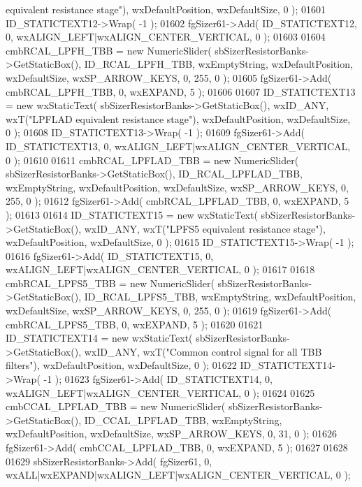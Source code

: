 \begin{DoxyCode}
{       equivalent resistance stage"}), wxDefaultPosition, wxDefaultSize, 0 );
01601     ID_STATICTEXT12->Wrap( -1 );
01602     fgSizer61->Add( ID_STATICTEXT12, 0, wxALIGN\_LEFT|wxALIGN\_CENTER\_VERTICAL, 0 );
01603     
01604     cmbRCAL_LPFH_TBB = \textcolor{keyword}{new} NumericSlider( sbSizerResistorBanks->GetStaticBox(), 
      ID_RCAL_LPFH_TBB, wxEmptyString, wxDefaultPosition, wxDefaultSize, wxSP\_ARROW\_KEYS, 0, 255, 0 );
01605     fgSizer61->Add( cmbRCAL_LPFH_TBB, 0, wxEXPAND, 5 );
01606     
01607     ID_STATICTEXT13 = \textcolor{keyword}{new} wxStaticText( sbSizerResistorBanks->GetStaticBox(), wxID\_ANY, wxT(\textcolor{stringliteral}{"LPFLAD
       equivalent resistance stage"}), wxDefaultPosition, wxDefaultSize, 0 );
01608     ID_STATICTEXT13->Wrap( -1 );
01609     fgSizer61->Add( ID_STATICTEXT13, 0, wxALIGN\_LEFT|wxALIGN\_CENTER\_VERTICAL, 0 );
01610     
01611     cmbRCAL_LPFLAD_TBB = \textcolor{keyword}{new} NumericSlider( sbSizerResistorBanks->GetStaticBox(), 
      ID_RCAL_LPFLAD_TBB, wxEmptyString, wxDefaultPosition, wxDefaultSize, wxSP\_ARROW\_KEYS, 0, 255, 0 );
01612     fgSizer61->Add( cmbRCAL_LPFLAD_TBB, 0, wxEXPAND, 5 );
01613     
01614     ID_STATICTEXT15 = \textcolor{keyword}{new} wxStaticText( sbSizerResistorBanks->GetStaticBox(), wxID\_ANY, wxT(\textcolor{stringliteral}{"LPFS5
       equivalent resistance stage"}), wxDefaultPosition, wxDefaultSize, 0 );
01615     ID_STATICTEXT15->Wrap( -1 );
01616     fgSizer61->Add( ID_STATICTEXT15, 0, wxALIGN\_LEFT|wxALIGN\_CENTER\_VERTICAL, 0 );
01617     
01618     cmbRCAL_LPFS5_TBB = \textcolor{keyword}{new} NumericSlider( sbSizerResistorBanks->GetStaticBox(), 
      ID_RCAL_LPFS5_TBB, wxEmptyString, wxDefaultPosition, wxDefaultSize, wxSP\_ARROW\_KEYS, 0, 255, 0 );
01619     fgSizer61->Add( cmbRCAL_LPFS5_TBB, 0, wxEXPAND, 5 );
01620     
01621     ID_STATICTEXT14 = \textcolor{keyword}{new} wxStaticText( sbSizerResistorBanks->GetStaticBox(), wxID\_ANY, wxT(\textcolor{stringliteral}{"Common control
       signal for all TBB filters"}), wxDefaultPosition, wxDefaultSize, 0 );
01622     ID_STATICTEXT14->Wrap( -1 );
01623     fgSizer61->Add( ID_STATICTEXT14, 0, wxALIGN\_LEFT|wxALIGN\_CENTER\_VERTICAL, 0 );
01624     
01625     cmbCCAL_LPFLAD_TBB = \textcolor{keyword}{new} NumericSlider( sbSizerResistorBanks->GetStaticBox(), 
      ID_CCAL_LPFLAD_TBB, wxEmptyString, wxDefaultPosition, wxDefaultSize, wxSP\_ARROW\_KEYS, 0, 31, 0 );
01626     fgSizer61->Add( cmbCCAL_LPFLAD_TBB, 0, wxEXPAND, 5 );
01627     
01628     
01629     sbSizerResistorBanks->Add( fgSizer61, 0, wxALL|wxEXPAND|wxALIGN\_LEFT|wxALIGN\_CENTER\_VERTICAL, 0 );

\end{DoxyCode}
